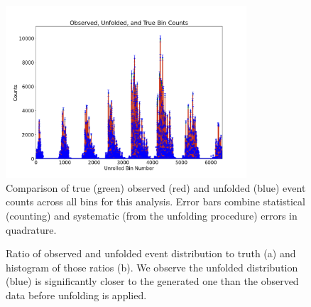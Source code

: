     \begin{figure}[H]
        \centering
        \includegraphics[trim={0 0 0 0},clip,width=0.8\textwidth]{Chapters/Ch5-Further/0_IBU/pics/complete/final_observed_unfolded_and_true_bin_counts.png}
        \caption[Comparison of Truth, Observed, and Unfolded Distributions]{Comparison of true (green) observed (red) and unfolded (blue) event counts across all bins for this analysis. Error bars combine statistical (counting) and systematic (from the unfolding procedure) errors in quadrature.}
        \label{fig:ibufullresult}
    \end{figure}


    \begin{figure}[ht]
        \centering
        \caption[Full Unfolding Residuals]{Ratio of observed and unfolded event distribution to truth (a) and histogram of those ratios (b). We observe the unfolded distribution (blue) is significantly closer to the generated one than the observed data before unfolding is applied.}
        \label{fig:residualsIBU}
    \end{figure}
    


